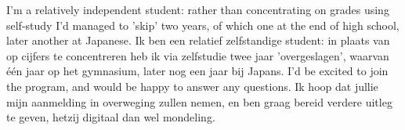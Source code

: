 \documentclass[11pt, a4paper]{awesome-cv}
\newcommand{\langen}[1]{\ifen#1\fi}
\newcommand{\langnl}[1]{\ifnl#1\fi}
\begin{document}
\begin{cvletter}
    \langen{I'm a relatively independent student:
    rather than concentrating on grades using self-study I'd managed to 'skip' two years, of which one at the end of high school, later another at Japanese.
    }\langnl{Ik ben een relatief zelfstandige student:
    in plaats van op cijfers te concentreren heb ik via zelfstudie twee jaar 'overgeslagen',
    waarvan één jaar op het gymnasium, later nog een jaar bij Japans.}
    \newline\newline
    \langen{I'd be excited to join the program,
    and would be happy to answer any questions.
    }\langnl{Ik hoop dat jullie mijn aanmelding in overweging zullen nemen,
    en ben graag bereid verdere uitleg te geven, hetzij digitaal dan wel mondeling.
    }
    
    \end{cvletter}
    \makeletterclosing
    
\end{document}
